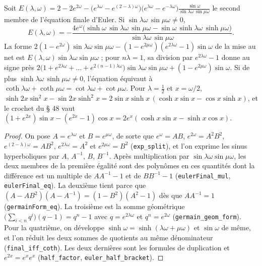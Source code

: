 \begin{enonce}
Soit $E(\lambda,\omega) = 2 - 2e^{2\omega} - \bigl(e^{\lambda\omega} - e^{(2-\lambda)\omega}\bigr)\bigl(e^{\lambda\omega} - e^{-\lambda\omega}\bigr)\frac{\sin\omega}{\sin\lambda\omega\,\sin\mu\omega}$ le second membre de l'équation finale d'Euler. Si $\sin\lambda\omega\,\sin\mu\omega \neq 0$,
\[
E(\lambda,\omega) = -\frac{4e^\omega\bigl(\sinh\omega\,\sin\lambda\omega\,\sin\mu\omega - \sin\omega\,\sinh\lambda\omega\,\sinh\mu\omega\bigr)}{\sin\lambda\omega\,\sin\mu\omega}.
\]
La forme $2(1 - e^{2\omega})\sin\lambda\omega\sin\mu\omega - (1 - e^{2\mu\omega})(e^{2\lambda\omega} - 1)\sin\omega$ de la mise au net est $E(\lambda,\omega)\sin\lambda\omega\sin\mu\omega$ ; pour $n\lambda = 1$, sa division par $e^{2\lambda\omega} - 1$ donne au signe près $2\bigl(1 + e^{2\lambda\omega} + \dots + e^{2(n-1)\lambda\omega}\bigr)\sin\lambda\omega\sin\mu\omega + (1 - e^{2\mu\omega})\sin\omega$. Si de plus $\sinh\lambda\omega\,\sinh\mu\omega \neq 0$, l'équation équivaut à $\coth\lambda\omega + \coth\mu\omega = \cot\lambda\omega + \cot\mu\omega$. Pour $\lambda = \frac12$ et $x = \omega/2$, $\sinh 2x\sin^2 x - \sin 2x\sinh^2 x = 2\sin x\sinh x\,(\cosh x\sin x - \cos x\sinh x)$, et le crochet du § 48 vaut $(1 + e^{2x})\sin x - (e^{2x} - 1)\cos x = 2e^x(\cosh x\sin x - \sinh x\cos x)$.
\end{enonce}

\begin{proof}
On pose $A = e^{\lambda\omega}$ et $B = e^{\mu\omega}$, de sorte que $e^\omega = AB$, $e^{2\omega} = A^2B^2$, $e^{(2-\lambda)\omega} = AB^2$, $e^{2\lambda\omega} = A^2$ et $e^{2\mu\omega} = B^2$ (\texttt{exp\_split}), et l'on exprime les sinus hyperboliques par $A$, $A^{-1}$, $B$, $B^{-1}$. Après multiplication par $\sin\lambda\omega\sin\mu\omega$, les deux membres de la première égalité sont des polynômes en ces quantités dont la différence est un multiple de $AA^{-1} - 1$ et de $BB^{-1} - 1$ (\texttt{eulerFinal\_mul}, \texttt{eulerFinal\_eq}). La deuxième tient parce que $(A - AB^2)(A - A^{-1}) = (1 - B^2)(A^2 - 1)$ dès que $AA^{-1} = 1$ (\texttt{germainForm\_eq}). La troisième est la somme géométrique $\bigl(\sum_{i<n} q^i\bigr)(q - 1) = q^n - 1$ avec $q = e^{2\lambda\omega}$ et $q^n = e^{2\omega}$ (\texttt{germain\_geom\_form}). Pour la quatrième, on développe $\sinh\omega = \sinh(\lambda\omega + \mu\omega)$ et $\sin\omega$ de même, et l'on réduit les deux sommes de quotients au même dénominateur (\texttt{final\_iff\_coth}). Les deux dernières sont les formules de duplication et $e^{2x} = e^x e^x$ (\texttt{half\_factor}, \texttt{euler\_half\_bracket}).
\end{proof}

